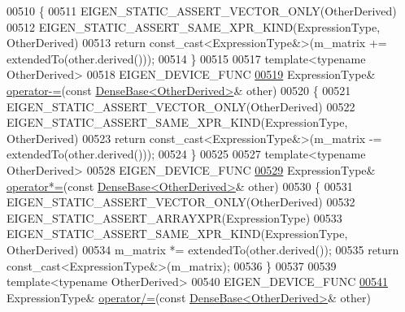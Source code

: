 \begin{DoxyCode}
00510     \{
00511       EIGEN\_STATIC\_ASSERT\_VECTOR\_ONLY(OtherDerived)
00512       EIGEN\_STATIC\_ASSERT\_SAME\_XPR\_KIND(ExpressionType, OtherDerived)
00513       \textcolor{keywordflow}{return} \textcolor{keyword}{const\_cast<}ExpressionType&\textcolor{keyword}{>}(m\_matrix += extendedTo(other.derived()));
00514     \}
00515 
00517     \textcolor{keyword}{template}<\textcolor{keyword}{typename} OtherDerived>
00518     EIGEN\_DEVICE\_FUNC
\hyperlink{group___core___module_acf1e97639651a9b617680ba3b3ece24a}{00519}     ExpressionType& \hyperlink{group___core___module_acf1e97639651a9b617680ba3b3ece24a}{operator-=}(\textcolor{keyword}{const} \hyperlink{group___core___module_class_eigen_1_1_dense_base}{DenseBase<OtherDerived>}& other)
00520     \{
00521       EIGEN\_STATIC\_ASSERT\_VECTOR\_ONLY(OtherDerived)
00522       EIGEN\_STATIC\_ASSERT\_SAME\_XPR\_KIND(ExpressionType, OtherDerived)
00523       \textcolor{keywordflow}{return} \textcolor{keyword}{const\_cast<}ExpressionType&\textcolor{keyword}{>}(m\_matrix -= extendedTo(other.derived()));
00524     \}
00525 
00527     \textcolor{keyword}{template}<\textcolor{keyword}{typename} OtherDerived>
00528     EIGEN\_DEVICE\_FUNC
\hyperlink{group___core___module_ad5e0f0005806295e07c11534f698351e}{00529}     ExpressionType& \hyperlink{group___core___module_ad5e0f0005806295e07c11534f698351e}{operator*=}(\textcolor{keyword}{const} \hyperlink{group___core___module_class_eigen_1_1_dense_base}{DenseBase<OtherDerived>}& other)
00530     \{
00531       EIGEN\_STATIC\_ASSERT\_VECTOR\_ONLY(OtherDerived)
00532       EIGEN\_STATIC\_ASSERT\_ARRAYXPR(ExpressionType)
00533       EIGEN\_STATIC\_ASSERT\_SAME\_XPR\_KIND(ExpressionType, OtherDerived)
00534       m\_matrix *= extendedTo(other.derived());
00535       \textcolor{keywordflow}{return} \textcolor{keyword}{const\_cast<}ExpressionType&\textcolor{keyword}{>}(m\_matrix);
00536     \}
00537 
00539     \textcolor{keyword}{template}<\textcolor{keyword}{typename} OtherDerived>
00540     EIGEN\_DEVICE\_FUNC
\hyperlink{group___core___module_ac04267f84ef1c52d88f452667cf757ae}{00541}     ExpressionType& \hyperlink{group___core___module_ac04267f84ef1c52d88f452667cf757ae}{operator/=}(\textcolor{keyword}{const} \hyperlink{group___core___module_class_eigen_1_1_dense_base}{DenseBase<OtherDerived>}& other)

\end{DoxyCode}
